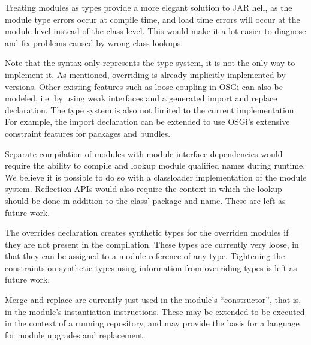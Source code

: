 Treating modules as types provide a more elegant solution to JAR hell, as the module
type errors occur at compile time, and load time errors will occur at the module level
instead of the class level. This would make it a lot easier to diagnose and
fix problems caused by wrong class lookups.

Note that the syntax only represents the type system, it is not the only way
to implement it. As mentioned, overriding is already implicitly implemented
by versions. Other existing features such as loose coupling in OSGi can
also be modeled, i.e. by using weak interfaces and a generated import and replace
declaration. The type system is also not limited to
the current implementation. For example, the import declaration can be 
extended to use OSGi's extensive constraint features for packages and bundles.

Separate compilation of modules with module interface dependencies would require
the ability to compile and lookup module qualified names during runtime. We believe
it is possible to do so with a classloader implementation of the module system. Reflection
APIs would also require the context in which the lookup should be done in addition to
the class' package and name. These are left as future work.

The overrides declaration creates synthetic types for the overriden modules 
if they are not present in the compilation. These types are currently very loose,
in that they can be assigned to a module reference of any type. Tightening the
constraints on synthetic types using information from overriding types is left
as future work.

Merge and replace are currently just used in the module's ``constructor'', that is, in
the module's instantiation instructions. These may be extended to be executed in the context
of a running repository, and may provide the basis for a language for module upgrades and replacement.

